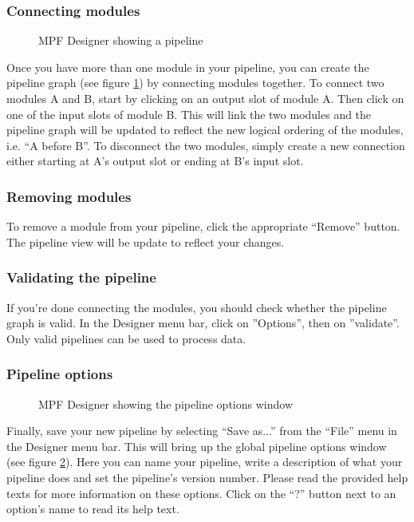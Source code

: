 \documentclass[11pt,fleqn,a4paper]{article}
\newcommand{\Figure}[4][optional,]{
  \begin{figure}[#1]
    \begin{center}
      \resizebox*{!}{#4\height}{\texttt{[image: \#2]}}
      \caption{#3 \label{#2}}
    \end{center}
  \end{figure}
}
\begin{document}
\subsubsection*{Connecting modules}

\Figure[!ht]{desg1.eps}{ MPF Designer showing a pipeline}{0.5}

Once you have more than one module in your pipeline, you can create the pipeline graph (see figure \ref{desg1.eps}) by connecting modules together. To connect two modules A and B, start by clicking on an output slot of module A. Then click on one of the input slots of module B. This will link the two modules and the pipeline graph will be updated to reflect the new logical ordering of the modules, i.e. ``A before B''. To disconnect the two modules, simply create a new connection either starting at A's output slot or ending at B's input slot.

\subsubsection*{Removing modules}

To remove a module from your pipeline, click the appropriate ``Remove'' button. The pipeline view will be update to reflect your changes.

\subsubsection*{Validating the pipeline}

If you're done connecting the modules, you should check whether the pipeline graph is valid. In the Designer menu bar, click on ''Options'', then on ''validate''. Only valid pipelines can be used to process data.

\subsubsection*{Pipeline options}

\Figure[!ht]{desg2.eps}{ MPF Designer showing the pipeline options window}{0.5}

Finally, save your new pipeline by selecting ``Save as...'' from the ``File'' menu in the Designer menu bar. This will bring up the global pipeline options window (see figure \ref{desg2.eps}). Here you can name your pipeline, write a description of what your pipeline does and set the pipeline's version number. Please read the provided help texts for more information on these options. Click on the ``?'' button next to an option's name to read its help text.
\end{document}
